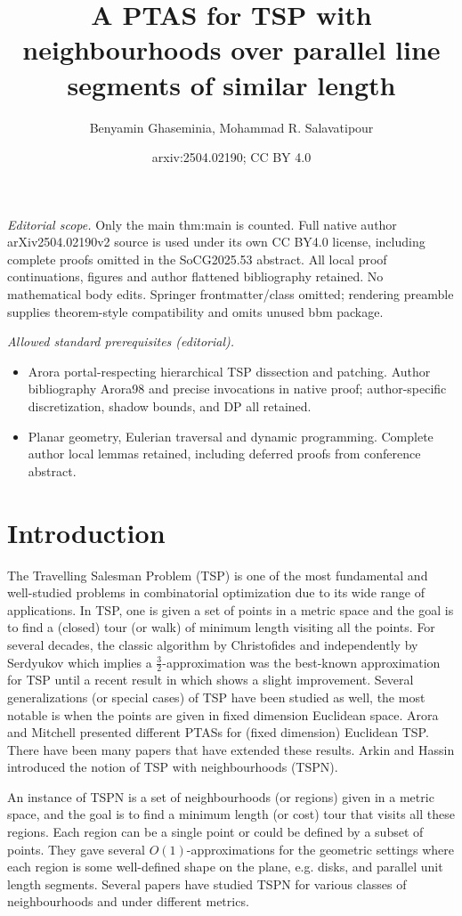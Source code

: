 \documentclass[10pt,a4paper]{amsart}
\title{A PTAS for TSP with neighbourhoods over parallel line segments of similar length}
\author{Benyamin Ghaseminia, Mohammad R. Salavatipour}
\date{arxiv:2504.02190; CC BY 4.0}
\theoremstyle{thmstyleone}
\begin{document}
\maketitle
\noindent\textit{Editorial scope.} Only the main thm:main is counted. Full native author arXiv2504.02190v2 source is used under its own CC BY4.0 license, including complete proofs omitted in the SoCG2025.53 abstract. All local proof continuations, figures and author flattened bibliography retained. No mathematical body edits. Springer frontmatter/class omitted; rendering preamble supplies theorem-style compatibility and omits unused bbm package.\par\medskip
\noindent\textit{Allowed standard prerequisites (editorial).}\begin{itemize}
\item Arora portal-respecting hierarchical TSP dissection and patching. Author bibliography Arora98 and precise invocations in native proof; author-specific discretization, shadow bounds, and DP all retained.
\item Planar geometry, Eulerian traversal and dynamic programming. Complete author local lemmas retained, including deferred proofs from conference abstract.
\end{itemize}\medskip
\section{Introduction}
The Travelling Salesman Problem (TSP) is one of the most fundamental and well-studied problems in combinatorial optimization due to its wide range of applications. In TSP, one is given a set of points in a metric space and the goal is to find a (closed) tour (or walk) of minimum length visiting all the points. 
For several decades, the classic algorithm by Christofides \cite{Christofides} and independently by Serdyukov \cite{Serdyukov78} which implies a $\frac{3}{2}$-approximation was the best-known approximation for TSP until a recent result in \cite{KKG22} which shows a slight improvement.
	Several generalizations (or special cases) of TSP have been studied as well, the most notable is when the points are given in fixed dimension Euclidean space. Arora and Mitchell \cite{Arora98,mitchell1999guillotine} presented different PTASs for (fixed dimension) Euclidean TSP. There have been many papers that have extended these results. Arkin and Hassin \cite{ArkinH94} introduced the notion of TSP with neighbourhoods (TSPN). 

	An instance of TSPN
	is a set of neighbourhoods (or regions) given in a metric space, and the goal is to find a minimum length (or cost) tour that visits all these regions. Each region can be a single point or could be defined by a subset of points. They gave several $O(1)$-approximations for the geometric settings
	where each region is some well-defined shape on the plane, e.g. disks, and parallel unit length segments. Several papers have studied TSPN for various classes of neighbourhoods and under different metrics.
	
\end{document}
